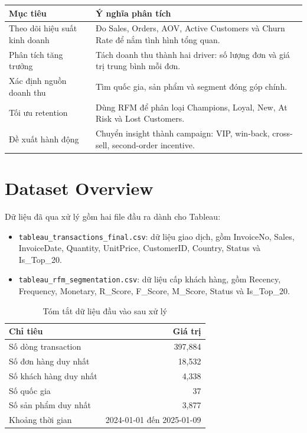 \documentclass[11pt,a4paper]{article}
\begin{document}
\begin{tabularx}{\textwidth}{p{3.6cm}X}
\toprule
\textbf{Mục tiêu} & \textbf{Ý nghĩa phân tích} \\
\midrule
Theo dõi hiệu suất kinh doanh & Đo Sales, Orders, AOV, Active Customers và Churn Rate để nắm tình hình tổng quan. \\
Phân tích tăng trưởng & Tách doanh thu thành hai driver: số lượng đơn và giá trị trung bình mỗi đơn. \\
Xác định nguồn doanh thu & Tìm quốc gia, sản phẩm và segment đóng góp chính. \\
Tối ưu retention & Dùng RFM để phân loại Champions, Loyal, New, At Risk và Lost Customers. \\
Đề xuất hành động & Chuyển insight thành campaign: VIP, win-back, cross-sell, second-order incentive. \\
\bottomrule
\end{tabularx}

\section{Dataset Overview}

Dữ liệu đã qua xử lý gồm hai file đầu ra dành cho Tableau:

\begin{itemize}
    \item \texttt{tableau\_transactions\_final.csv}: dữ liệu giao dịch, gồm InvoiceNo, Sales, InvoiceDate, Quantity, UnitPrice, CustomerID, Country, Status và Is\_Top\_20.
    \item \texttt{tableau\_rfm\_segmentation.csv}: dữ liệu cấp khách hàng, gồm Recency, Frequency, Monetary, R\_Score, F\_Score, M\_Score, Status và Is\_Top\_20.
\end{itemize}

\begin{table}[H]
\centering
\caption{Tóm tắt dữ liệu đầu vào sau xử lý}
\begin{tabular}{lr}
\toprule
\textbf{Chỉ tiêu} & \textbf{Giá trị} \\
\midrule
Số dòng transaction & 397,884 \\
Số đơn hàng duy nhất & 18,532 \\
Số khách hàng duy nhất & 4,338 \\
Số quốc gia & 37 \\
Số sản phẩm duy nhất & 3,877 \\
Khoảng thời gian & 2024-01-01 đến 2025-01-09 \\
\bottomrule
\end{tabular}
\end{table}
\end{document}
